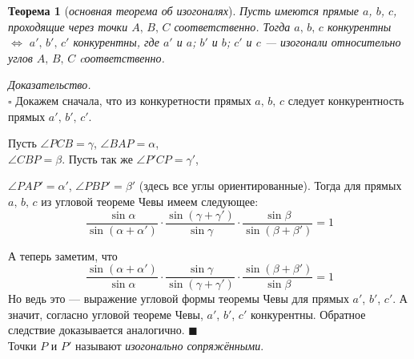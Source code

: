 \documentclass[14pt]{extarticle}
\newtheorem*{theorem}{\normalfont\fontsize{15}{15}\textup{Теорема}}
\renewenvironment{proof}
    {\noindent \textit{Доказательство.}\\
	\indent $\square$}
	{ $\blacksquare$\\ }
\begin{document}
\begin{theorem}[\textit{основная теорема об изогоналях}]
Пусть имеются прямые \(a\), \(b\), \(c\), проходящие через точки \(A,\, B,
\, C\) соответственно. Тогда \(a, \, b, \, c\)  конкурентны \(\iff\)
\(a', \, b', \, c'\) конкурентны, 
где \(a'\) и \(a\); \(b'\) и \(b\); \(c'\) и \(c\) --- изогонали
относительно углов \(A,\, B, \, C\) cоответственно.
\end{theorem}


\begin{proof}
Докажем сначала, что из конкуретности прямых \(a, \, b, \, c\)
следует конкурентность прямых \(a', \, b', \, c'\).

Пусть \(\angle PCB = \gamma\), \( \angle BAP = \alpha\), \\
\(\angle CBP = \beta\). Пусть так же \(\angle P'CP = \gamma'\), \par
\begin{figure}
    \vspace{-2cm}
\end{figure}
\noindent\(\angle PAP' = \alpha'\), \(\angle PBP' = \beta'\) (здесь все углы
ориентированные). Тогда для прямых  \(a, \, b, \, c\) из угловой теореме
Чевы имеем следующее:
\[
\frac{\sin \alpha}{\sin(\alpha + \alpha ')} \cdot
\frac{\sin(\gamma + \gamma ')}{\sin \gamma} \cdot
\frac{\sin \beta}{\sin(\beta + \beta ')} 
 = 1
\]

\noindent А теперь заметим, что 
\[
\frac{\sin(\alpha + \alpha ')}{\sin \alpha} \cdot
\frac{\sin \gamma}{\sin(\gamma + \gamma ')} \cdot
\frac{\sin(\beta + \beta ')}{\sin \beta} 
 = 1
\]
Но ведь это --- выражение угловой формы теоремы Чевы для прямых
\(a'\), \(b'\), \(c'\). А значит, согласно угловой теореме Чевы, 
\(a'\), \(b'\), \(c'\) конкурентны.
Обратное следствие доказывается аналогично.
\end{proof}
 Точки \(P\) и \(P'\) называют \textit{изогонально сопряжёнными}.\\
\end{document}
